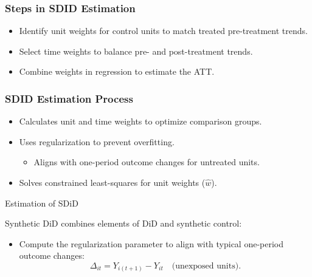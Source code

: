 \documentclass{beamer}
\begin{document}
\begin{frame}
\frametitle{Steps in SDID Estimation}

\begin{itemize}
    \item Identify unit weights for control units to match treated pre-treatment trends.
    \item Select time weights to balance pre- and post-treatment trends.
    \item Combine weights in regression to estimate the ATT.
\end{itemize}

\end{frame}



\begin{frame}
\frametitle{SDID Estimation Process}

\begin{itemize}
    \item Calculates unit and time weights to optimize comparison groups.
    \item Uses regularization to prevent overfitting.
        \begin{itemize}
            \item Aligns with one-period outcome changes for untreated units.
        \end{itemize}
    \item Solves constrained least-squares for unit weights (\(\hat{w}\)).
\end{itemize}

\end{frame}

\begin{frame}{Estimation of SDiD}

Synthetic DiD combines elements of DiD and synthetic control:
\begin{itemize}
    \item Compute the regularization parameter to align with typical one-period outcome changes:
    \[
    \Delta_{it} = Y_{i(t+1)} - Y_{it} \quad \text{(unexposed units)}.
    \]
\end{itemize}

\end{frame}
\end{document}
